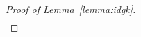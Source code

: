 \begin{proof}[Proof of Lemma~\ref{lemma:idgk}]
\begin{equation}
\begin{aligned}
    \end{aligned}
  \end{equation}

\end{proof}
